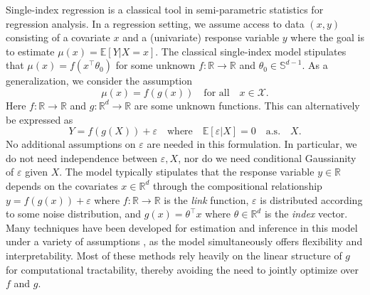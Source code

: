 \documentclass[11pt]{article}
\begin{document}
Single-index regression is a classical tool in semi-parametric statistics for regression analysis. In a regression setting, we assume access to data $(x, y)$ consisting of a covariate $x$ and a  (univariate) response variable $y$ where the goal is to estimate $\mu(x) = \mathbb{E}[Y|X = x]$. The classical single-index model stipulates that $\mu(x) = f(x^{\top}\theta_0)$ for some unknown $f:\mathbb{R}\to\mathbb{R}$ and $\theta_0\in\mathbb{S}^{d-1}$. As a generalization, we consider the assumption
\begin{equation}\label{eq:non-linear-index-model}
    \mu(x) = f(g(x))\quad\mbox{for all}\quad x\in\mathcal{X}.
\end{equation}
Here $f:\mathbb{R}\to\mathbb{R}$ and $g:\mathbb{R}^d\to\mathbb{R}$ are some unknown functions. This can alternatively be expressed as 
\[
Y = f(g(X)) + \varepsilon\quad\mbox{where}\quad \mathbb{E}[\varepsilon|X] = 0\quad\mbox{a.s.}\quad X.
\]
No additional assumptions on $\varepsilon$ are needed in this formulation. In particular, we do not need independence between $\varepsilon, X$, nor do we need conditional Gaussianity of $\varepsilon$ given $X$.
The model typically stipulates that the response variable $y \in \mathbb{R}$ depends on the covariates $x \in \mathbb{R}^d$ through the compositional relationship $y = f(g(x)) + \varepsilon$ where $f: \mathbb{R} \to \mathbb R$ is the \emph{link} function, $\varepsilon$ is distributed according to some noise distribution, and $g(x) = \theta^\top x$ where $\theta \in \mathbb{R}^d$ is the \emph{index} vector. Many techniques have been developed for estimation and inference in this model under a variety of assumptions \citep{li1991sliced,dennis2000save,li2005contour,li2007directional, li1989regression}, as the model simultaneously offers flexibility and interpretability. Most of these methods rely heavily on the linear structure of $g$ for computational tractability, thereby avoiding the need to jointly optimize over $f$ and $g$. 
\end{document}
